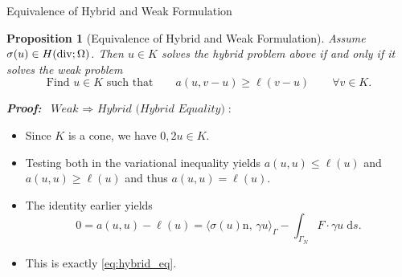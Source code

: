 \documentclass[10pt,aspectratio=169]{beamer}
\newtheorem{proposition}{Proposition}[section]
\def\d{{\mathrm{d}}}
\def\ds{{\d s}}
\newcommand{\diver}{\operatornamewithlimits{div}}
\begin{document}
\begin{frame}{Equivalence of Hybrid and Weak Formulation}
	\begin{proposition}[Equivalence of Hybrid and Weak Formulation]
		Assume $\sigma(u)\in H(\diver;\Omega)$. Then $u\in K$ solves the hybrid problem above if and only if it solves the weak problem
		\begin{equation*}
			\text{Find }u\in K\text{ such that}\qquad a(u,v-u)\ge\ell(v-u)\qquad \forall v\in K.
		\end{equation*}
	\end{proposition}
	\textbf{\em Proof:} $\ \textit{Weak }\Rightarrow\textit{ Hybrid (Hybrid Equality)}$:
	\begin{itemize}
		\item Since $K$ is a cone, we have $0,2u\in K$.
		\item Testing both in the variational inequality yields $a(u,u)\le \ell(u)$ and $a(u,u)\ge \ell(u)$ and thus $a(u,u)= \ell(u)$.
		\item The identity earlier yields
		      \begin{equation*}
			      0 = a(u,u)-\ell(u) = \langle\sigma(u)\mathrm{n},\,\gamma u\rangle_\Gamma -\int_{\Gamma_N}F\cdot\gamma u\;\ds.
		      \end{equation*}
		\item This is exactly \eqref{eq:hybrid_eq}.
	\end{itemize}
\end{frame}
\end{document}
